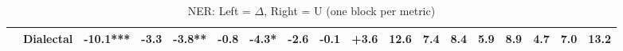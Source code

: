 \begin{table}[h]
{\begin{tabular}{llrrrrrrrrrrrrrrrr}
  & \textbf{Dialectal} & \cellcolor{red!20} \textbf{-10.1}*** & \cellcolor{red!6} \textbf{-3.3} & \cellcolor{red!7} \textbf{-3.8}** & \cellcolor{red!1} -0.8 & \cellcolor{red!8} \textbf{-4.3}* & \cellcolor{red!5} \textbf{-2.6} & \cellcolor{red!0} -0.1 & \cellcolor{green!7} +3.6 & \cellcolor{blue!33} 12.6 & \cellcolor{blue!19} 7.4 & \cellcolor{blue!22} 8.4 & \cellcolor{blue!15} 5.9 & \cellcolor{blue!23} 8.9 & \cellcolor{blue!12} 4.7 & \cellcolor{blue!18} 7.0 & \cellcolor{blue!34} 13.2 \\
\bottomrule
\end{tabular}}
\caption{NER: Left = $\Delta$, Right = U (one block per metric)}\label{tab:ner_dual}
\end{table}